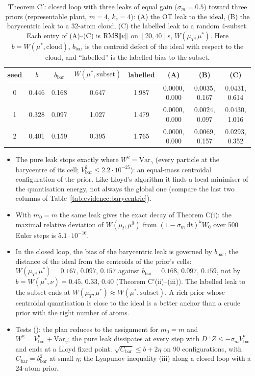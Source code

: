 \begin{table}[htbp]
\centering
\footnotesize
\caption{Theorem C$'$: closed loop with three leaks of equal gain ($\sigma_m=0.5$) toward three priors (representable
plant, $m=4$, $k_e=4$): (A) the OT leak to the ideal, (B) the barycentric leak to a 32-atom cloud, (C) the labelled
leak to a random 4-subset. Each entry of (A)--(C) is $\operatorname{RMS}\lVert e\rVert$ on $[20,40]$\,s, $W(\mu_T,\mu^*)$. Here
$b=W(\mu^*,\mathrm{cloud})$, $b_{\mathrm{bar}}$ is the centroid defect of the ideal with respect to the cloud, and
``labelled'' is the labelled bias to the subset.}
\label{tab:evidence:barycentricloop}
\setlength{\tabcolsep}{3.5pt}
\begin{tabular}{@{}cccccccc@{}}
\toprule
seed & $b$ & $b_{\mathrm{bar}}$ & $W(\mu^*,\mathrm{subset})$ & labelled & (A) & (B) & (C)\\
\midrule
0 & 0.446 & 0.168 & 0.647 & 1.987 & 0.0000, 0.000 & 0.0035, 0.167 & 0.0431, 0.614\\
1 & 0.328 & 0.097 & 1.027 & 1.479 & 0.0000, 0.000 & 0.0024, 0.097 & 0.0430, 1.016\\
2 & 0.401 & 0.159 & 0.395 & 1.765 & 0.0000, 0.000 & 0.0069, 0.157 & 0.0293, 0.352\\
\bottomrule
\end{tabular}
\end{table}

\begin{itemize}
  \item The pure leak stops exactly where $W^2=\mathrm{Var}_\gamma$ (every particle at the barycentre of its cell;
    $V_{\mathrm{bar}}^2\le2.2\cdot10^{-25}$): an equal-mass centroidal configuration of the prior. Like Lloyd's
    algorithm it finds a local minimiser of the quantisation energy, not always the global one (compare the last two
    columns of Table~\ref{tab:evidence:barycentric}).
  \item With $m_0=m$ the same leak gives the exact decay of Theorem C(i): the maximal relative deviation of
    $W(\mu_t,\mu^0)$ from $(1-\sigma_m\,\mathrm{d}t)^kW_0$ over 500 Euler steps is $5.1\cdot10^{-16}$.
  \item In the closed loop, the bias of the barycentric leak is governed by $b_{\mathrm{bar}}$, the distance of the
    ideal from the centroids of the prior's cells: $W(\mu_T,\mu^*)=0.167$, $0.097$, $0.157$ against
    $b_{\mathrm{bar}}=0.168$, $0.097$, $0.159$, not by $b=W(\mu^*,\nu)=0.45$, $0.33$, $0.40$ (Theorem C$'$(ii)--(iii)).
    The labelled leak to the subset ends at $W(\mu_T,\mu^*)\approx W(\mu^*,\mathrm{subset})$. A rich prior whose
    centroidal quantisation is close to the ideal is a better anchor than a crude prior with the right number of
    atoms.
  \item Tests (): the plan reduces to the assignment for $m_0=m$ and
    $W^2=V_{\mathrm{bar}}^2+\mathrm{Var}_\gamma$; the pure leak dissipates at every step with
    $D^+Z\le-\sigma_mV_{\mathrm{bar}}^2$ and ends at a Lloyd fixed point; $\sqrt{C_{\mathrm{bar}}}\le b+2\eta$ on 90
    configurations, with $C_{\mathrm{bar}}=b_{\mathrm{bar}}^2$ at small $\eta$; the Lyapunov inequality (iii) along a
    closed loop with a 24-atom prior.
\end{itemize}

